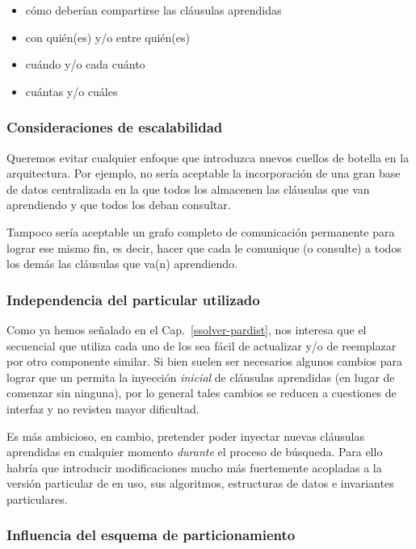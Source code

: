 \begin{itemize}
\item cómo deberían compartirse las cláusulas aprendidas
\item con quién(es) y/o entre quién(es)
\item cuándo y/o cada cuánto
\item cuántas y/o cuáles
\end{itemize}

\subsubsection{Consideraciones de escalabilidad}

Queremos evitar cualquier enfoque que introduzca nuevos cuellos de botella en
la arquitectura. Por ejemplo, no sería aceptable la incorporación de una gran
base de datos centralizada en la que todos los \ws almacenen las cláusulas que
van aprendiendo y que todos los \ws deban consultar.

Tampoco sería aceptable un grafo completo de comunicación permanente para
lograr ese mismo fin, es decir, hacer que cada \w le comunique (o consulte) a
todos los demás las cláusulas que va(n) aprendiendo.


\subsubsection{Independencia del \ssolver particular utilizado}

Como ya hemos señalado en el Cap.~\ref{ssolver-pardist}, nos interesa que el \ssolver
secuencial que utiliza cada uno de los \ws sea fácil de actualizar y/o de
reemplazar por otro componente \ots similar. Si bien suelen ser necesarios
algunos cambios para lograr que un \ssolver permita la inyección
\emph{inicial} de cláusulas aprendidas (en lugar de comenzar sin ninguna), por
lo general tales cambios se reducen a cuestiones de interfaz y no revisten
mayor dificultad.

Es más ambicioso, en cambio, pretender poder inyectar nuevas cláusulas
aprendidas en cualquier momento \emph{durante} el proceso de búsqueda. Para
ello habría que introducir modificaciones mucho más fuertemente acopladas a la
versión particular de \ssolver en uso, sus algoritmos, estructuras de datos e
invariantes particulares.


\subsubsection{Influencia del esquema de particionamiento}

